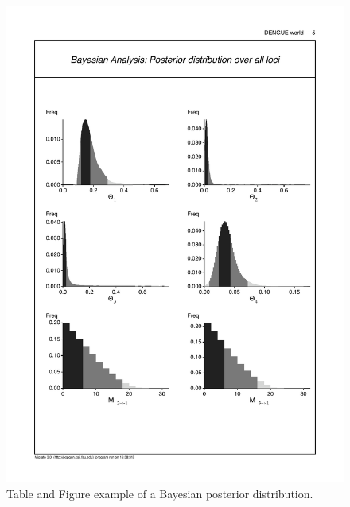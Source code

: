 \begin{figure}[htb]
\begin{center}
\includegraphics[scale=0.6]{mim/bayeshist}
\end{center}
\caption{Table and Figure example of a Bayesian posterior distribution. \label{BAYESTABLEHIST}}
\end{figure}




